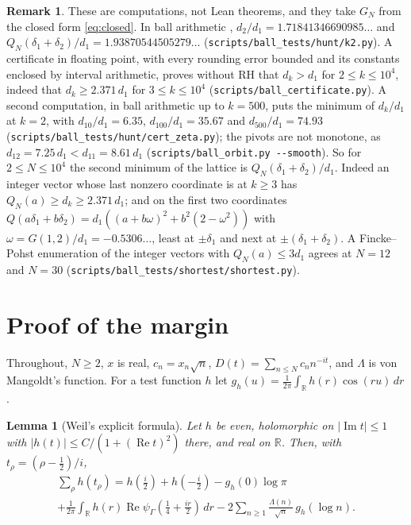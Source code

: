 \documentclass[11pt]{article}
\newtheorem{lemma}[theorem]{Lemma}
\theoremstyle{definition}
\newtheorem*{remark}{Remark}
\begin{document}
\begin{remark}
These are computations, not Lean theorems, and they take $G_N$ from the closed form \eqref{eq:closed}. In ball
arithmetic \cite{arb}, $d_2/d_1 = 1.71841346690985\ldots$ and $Q_N(\delta_1 + \delta_2)/d_1 =
1.93870544505279\ldots$ (\texttt{scripts/ball\_tests/hunt/k2.py}). A certificate in floating point, with every
rounding error bounded and its constants enclosed by interval arithmetic, proves without RH that $d_k > d_1$ for $2
\le k \le 10^4$, indeed that $d_k \ge 2.371\,d_1$ for $3 \le k \le 10^4$ (\texttt{scripts/ball\_certificate.py}). A
second computation, in ball arithmetic up to $k = 500$, puts the minimum of $d_k/d_1$ at $k = 2$, with $d_{10}/d_1 =
6.35$, $d_{100}/d_1 = 35.67$ and $d_{500}/d_1 = 74.93$ (\texttt{scripts/ball\_tests/hunt/cert\_zeta.py}); the pivots
are not monotone, as $d_{12} = 7.25\,d_1 < d_{11} = 8.61\,d_1$ (\texttt{scripts/ball\_orbit.py -{}-smooth}). So for
$2 \le N \le 10^4$ the second minimum of the lattice is $Q_N(\delta_1 + \delta_2)/d_1$. Indeed an integer vector
whose last nonzero coordinate is at $k \ge 3$ has $Q_N(a) \ge d_k \ge 2.371\,d_1$;
and on the first two coordinates $Q(a\delta_1 + b\delta_2) = d_1((a + b\omega)^2 + b^2(2 - \omega^2))$ with $\omega =
G(1, 2)/d_1 = -0.5306\ldots$, least at $\pm\delta_1$ and next at $\pm(\delta_1 + \delta_2)$. A Fincke--Pohst enumeration
\cite{fincke-pohst} of the integer vectors with $Q_N(a) \le 3d_1$ agrees at $N = 12$ and $N = 30$
(\texttt{scripts/ball\_tests/shortest/shortest.py}).
\end{remark}

\section{Proof of the margin}\label{sec:proof}

Throughout, $N \ge 2$, $x$ is real, $c_n = x_n \sqrt n$, $D(t) = \sum_{n \le N} c_n n^{-it}$, and $\Lambda$ is von
Mangoldt's function. For a test function $h$ let $g_h(u) = \frac{1}{2\pi} \int_{\mathbb R} h(r) \cos(ru)\,dr$.

\begin{lemma}[Weil's explicit formula]\label{lem:explicit}
Let $h$ be even, holomorphic on $|\operatorname{Im} t| \le 1$ with $|h(t)| \le C/(1 + (\operatorname{Re} t)^2)$ there,
and real on $\mathbb R$. Then, with $t_\rho = (\rho - \frac12)/i$,
\begin{multline*}
\sum_\rho h(t_\rho) = h(\tfrac i2) + h(-\tfrac i2) - g_h(0) \log \pi \\
+ \frac{1}{2\pi} \int_{\mathbb R} h(r) \operatorname{Re} \psi_\Gamma(\tfrac14 + \tfrac{ir}{2})\,dr - 2 \sum_{n \ge 1}
\frac{\Lambda(n)}{\sqrt n}\, g_h(\log n).
\end{multline*}
\end{lemma}
\end{document}
